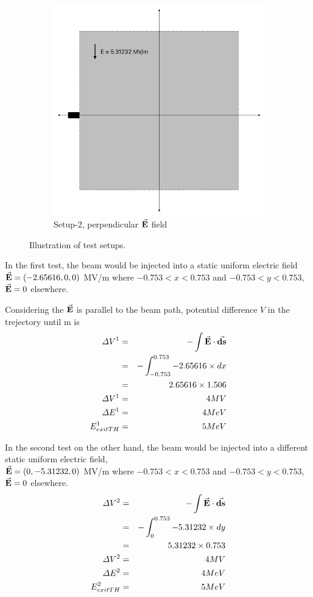 \documentclass[a4paper,oneside,12pt]{report}
\numberwithin{equation}{chapter}
\begin{document}
\begin{figure}[H]
\begin{subfigure}{0.48\textwidth}
        \includegraphics[width=0.9\linewidth]{./figures/illustrations/statE_2.png}
        \caption*{Setup-2, perpendicular $\vec{\textbf{E}}$ field}
    \end{subfigure}
    \caption{Illustration of test setups.}
\end{figure}

In the first test, the beam would be injected into a static uniform electric field \\
$\vec{\textbf{E}}=(-2.65616, 0, 0)$ MV/m where $-0.753<x<0.753$ and $-0.753<y<0.753$, $\vec{\textbf{E}}=0$ elsewhere.

Considering the $\vec{\textbf{E}}$ is parallel to the beam path, potential difference $V$ in the trejectory until m is
\begin{eqnarray}
    \Delta V^1 &=& - \int \vec{\textbf{E}} \cdot \vec{\textbf{ds}} \\
             &=& - \int_{-0.753}^{0.753} -2.65616 \times dx \\
             &=& 2.65616 \times 1.506 \\
    \Delta V^1 &=& 4 MV \\
    \Delta E^1 &=& 4 MeV \\
    E_{exitTH}^1 &=& 5 MeV
\end{eqnarray}

In the second test on the other hand, the beam would be injected into a different static uniform electric field, \\
$\vec{\textbf{E}}=(0, -5.31232, 0)$ MV/m where $-0.753<x<0.753$ and $-0.753<y<0.753$, $\vec{\textbf{E}}=0$ elsewhere.
\begin{eqnarray}
    \Delta V^2   &=& - \int \vec{\textbf{E}} \cdot \vec{\textbf{ds}} \\
                 &=& - \int_{0}^{0.753} -5.31232 \times dy \\
                 &=& 5.31232 \times 0.753 \\
    \Delta V^2   &=& 4 MV \\
    \Delta E^2   &=& 4 MeV \\
    E_{exitTH}^2 &=& 5 MeV
\end{eqnarray}
\end{document}
